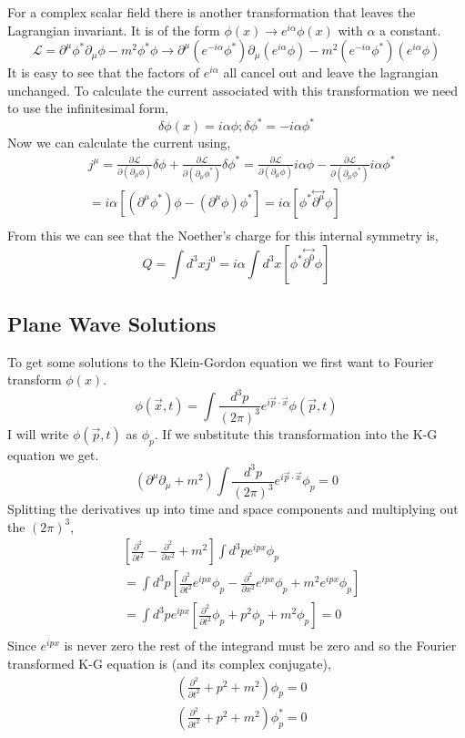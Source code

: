 \documentclass{article}
\numberwithin{equation}{section}
\newcommand{\Lagr}{\mathcal{L}}  %
\newcommand{\dmu}{\partial_{\mu}}
\newcommand{\Dmu}{\partial^{\mu}}
\newcommand{\ddl}[1]{\frac{\partial \Lagr}{\partial(\partial_{#1} \phi)}}
\newcommand{\cddl}[1]{\frac{\partial \Lagr}{\partial(\partial_{#1} \phi^*)}}
\newcommand{\forint}{\int \frac{d^3p}{(2\pi)^3} e^{i\vec{p} \cdot \vec{x}}}
\newcommand{\beq}{\begin{equation}}
\newcommand{\eeq}{\end{equation}}
\begin{document}
For a complex scalar field there is another transformation that leaves the Lagrangian invariant. It is of the form $\phi(x) \rightarrow e^{i\alpha}\phi(x)$ with $\alpha$ a constant.
\beq
    \Lagr = \Dmu\phi^* \dmu\phi - m^2\phi^*\phi \rightarrow \Dmu(e^{-i\alpha}\phi^*) \dmu(e^{i\alpha}\phi) - m^2(e^{-i\alpha}\phi^*)(e^{i\alpha}\phi)
\eeq
It is easy to see that the factors of $e^{i\alpha}$ all cancel out and leave the lagrangian unchanged.
To calculate the current associated with this transformation we need to use the infinitesimal form,
\beq
    \delta \phi(x) = i\alpha\phi ; \delta \phi^* = -i\alpha\phi^*
\eeq
Now we can calculate the current using,
\beq \begin{split}
    &j^\mu = \ddl{\mu} \delta\phi + \cddl{\mu}\delta\phi^* = \ddl{\mu} i\alpha\phi - \cddl{\mu}i\alpha\phi^* \\
    &= i\alpha \left[ (\Dmu\phi^*)\phi - (\Dmu \phi)\phi^* \right] = i\alpha \left[ \phi^* \stackrel{\leftrightarrow}{\partial^{\mu}}\phi \right] \\
\end{split} \eeq 
From this we can see that the Noether's charge for this internal symmetry is,
\beq
    Q= \int d^3x j^0 = i\alpha \int d^3x \left[ \phi^* \stackrel{\leftrightarrow}{\partial^{0}}\phi \right]
\eeq
    
\subsection{Plane Wave Solutions}

To get some solutions to the Klein-Gordon equation we first want to Fourier transform $\phi(x)$.
\beq
    \phi(\vec{x},t) = \forint \phi(\vec{p},t)
\eeq
I will write $\phi(\vec{p},t)$ as $\phi_p$. If we substitute this transformation into the K-G equation we get.
\beq
    (\Dmu \dmu + m^2) \forint \phi_p = 0
\eeq
Splitting the derivatives up into time and space components and multiplying out the $(2\pi)^3$,
\beq \begin{split}
    &\left[\frac{\partial^2}{\partial t^2} - \frac{\partial^2}{\partial x^2} + m^2 \right] \int d^3p e^{ipx}\phi_p \\
    &= \int d^3p \left[\frac{\partial^2}{\partial t^2}e^{ipx}\phi_p - \frac{\partial^2}{\partial x^2}e^{ipx}\phi_p + m^2e^{ipx}\phi_p \right]\\
    &= \int d^3p e^{ipx} \left[ \frac{\partial^2}{\partial t^2}\phi_p + p^2\phi_p +m^2\phi_p \right] = 0\\
\end{split} \eeq
Since $e^{ipx}$ is never zero the rest of the integrand must be zero and so the Fourier transformed K-G equation is (and its complex conjugate),
\beq \begin{split}
   &\left( \frac{\partial^2}{\partial t^2} +p^2 +m^2 \right) \phi_p = 0 \\
   &\left( \frac{\partial^2}{\partial t^2} +p^2 +m^2 \right) \phi^*_p = 0 \\
\end{split} \eeq
\end{document}
